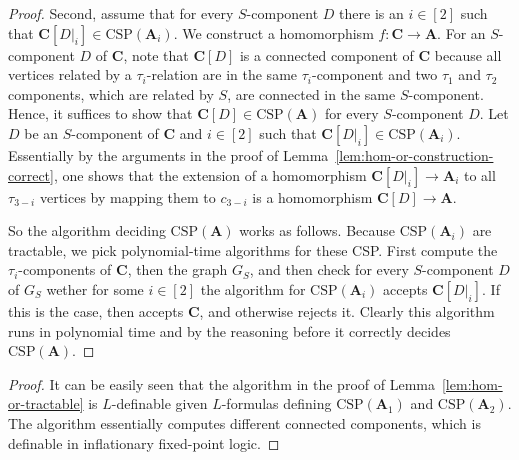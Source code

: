 \documentclass[a4paper,english, thm-restate]{lipics-v2021}
\newcommand{\sig}{\tau}
\newcommand{\StructA}{\mathbf{A}}
\newcommand{\StructC}{\mathbf{C}}
\newcommand{\CSP}[1]{\mathrm{CSP}(#1)}
\newcommand{\restrict}[2]{#1|_{#2}}
\begin{document}
\begin{proof}
		Second, assume that for every $S$-component $D$  there is an $i\in[2]$
		such that $\StructC[\restrict{D}{i}] \in \CSP{\StructA_i}$.
		We construct a homomorphism $f \colon \StructC \to \StructA$.
		For an  $S$-component $D$ of $\StructC$,
		note that $\StructC[D]$ is a connected component of $\StructC$
		because all vertices related by a $\sig_i$-relation are in the same $\sig_i$-component and two $\sig_1$ and $\sig_2$ components, which are related by $S$, are connected in the same $S$-component.
		Hence, it suffices to show that $\StructC[D] \in \CSP{\StructA}$
		for every $S$-component $D$.
		Let $D$ be an $S$-component of $\StructC$
		and $i\in[2]$ such that $\StructC[\restrict{D}{i}] \in \CSP{\StructA_i}$.
		Essentially by the arguments in the proof of Lemma~\ref{lem:hom-or-construction-correct},
		one shows that the extension of a homomorphism $\StructC[\restrict{D}{i}] \to \StructA_i$ to all $\sig_{3-i}$ vertices by mapping them to $c_{3-i}$
		is a homomorphism $\StructC[D] \to \StructA$.
		
		So the algorithm deciding $\CSP{\StructA}$ works as follows.
		Because $\CSP{\StructA_i}$ are tractable,
		we pick polynomial-time algorithms for these CSP.
		First compute the $\sig_i$-components of $\StructC$,
		then the graph $G_S$,
		and then check for every $S$-component $D$ of $G_S$
		wether for some $i\in[2]$
		the algorithm for $\CSP{\StructA_i}$ accepts $\StructC[\restrict{D}{i}]$.
		If this is the case, then accepts $\StructC$,
		and otherwise rejects it.
		Clearly this algorithm runs in polynomial time
		and by the reasoning before it correctly decides $\CSP{\StructA}$.
	\end{proof}
	
	\homOrDefinable*
	\begin{proof}
		It can be easily seen that the algorithm in the proof of Lemma~\ref{lem:hom-or-tractable} is $L$-definable 
		given $L$-formulas defining $\CSP{\StructA_1}$ and $\CSP{\StructA_2}$.
		The algorithm essentially computes different connected components,
		which is definable in inflationary fixed-point logic.
	\end{proof}
	
\end{document}
